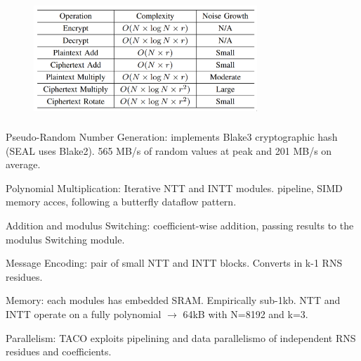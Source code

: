 \documentclass[10pt]{beamer}
\begin{document}
\begin{frame}[noframenumbering]
\frametitle{}
\begin{figure}
    \includegraphics[width=0.75\textwidth]{complexity.png}
\end{figure}

\end{frame}

\begin{frame}[noframenumbering]
\frametitle{}
    Pseudo-Random Number Generation: implements Blake3 cryptographic hash (SEAL uses Blake2).
    565 MB/s of random values at peak and 201 MB/s on average.

    Polynomial Multiplication: Iterative NTT and INTT modules. pipeline, SIMD memory acces, following a
    butterfly dataflow pattern.

    Addition and modulus Switching: coefficient-wise addition, passing results to the modulus Switching module.

    Message Encoding: pair of small NTT and INTT blocks. Converts in k-1 RNS residues.

    Memory: each modules has embedded SRAM. Empirically sub-1kb. NTT and INTT operate on a fully
    polynomial $\rightarrow$ 64kB with N=8192 and k=3.

    Parallelism: TACO exploits pipelining and data parallelismo of independent RNS residues and coefficients.


\end{frame}
\end{document}
